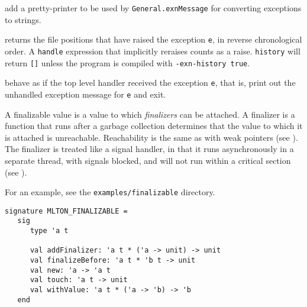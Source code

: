 \begin{description}

add a pretty-printer to be used by {\tt General.exnMessage} for
converting exceptions to strings.

returns the file positions that have raised the exception {\tt e}, in reverse
chronological order.   A {\tt handle} expression that implicitly reraises counts
as a raise.  {\tt history} will return {\tt []} unless the program is compiled
with {\tt -exn-history true}.

behave as if the top level handler received the exception {\tt e},
that is, print out the unhandled exception message for {\tt e} and
exit.

\end{description}

A finalizable value is a value to which {\em finalizers} can be
attached.  A finalizer is a function that runs after a garbage
collection determines that the value to which it is attached is
unreachable.  Reachability is the same as with weak pointers (see
).  The finalizer is treated like a signal handler, in
that it runs asynchronously in a separate thread, with signals
blocked, and will not run within a critical section (see
).

For an example, see the {\tt examples/finalizable} directory.

\begin{verbatim}
signature MLTON_FINALIZABLE =
   sig
      type 'a t

      val addFinalizer: 'a t * ('a -> unit) -> unit
      val finalizeBefore: 'a t * 'b t -> unit
      val new: 'a -> 'a t
      val touch: 'a t -> unit
      val withValue: 'a t * ('a -> 'b) -> 'b
   end
\end{verbatim}

